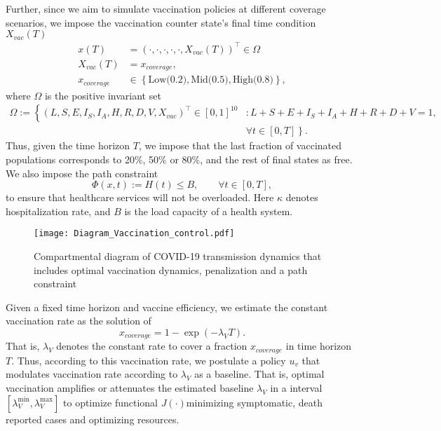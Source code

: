     Further, since we aim to simulate vaccination policies at different coverage
scenarios, we impose the vaccination counter state's final time condition
$X_{vac}(T)$
\begin{equation}
    \begin{aligned}
      x(T) &= (\cdot, \cdot, \cdot, \cdot, \cdot, X_{vac }(T))^{\top}
      \in \Omega
      \\
      X_{vac}(T)
        &= x_{cover age},
      \\
      x_{coverage}
        & \in
        \left \{
          \text{Low(0.2)},\text{Mid(0.5)}, \text{High(0.8)}
        \right \},
    \end{aligned}
\end{equation}
where $\Omega$ is the positive invariant set
\begin{equation*}
    \begin{aligned}
    \Omega := \left\{ \right. 
        (L, S, E, I_S, I_A, H, R, D, V, X_{vac}) ^{\top} \in [0,1]^{10}
        &: 
        L + S + E + I_S + I_A + H+ R + D + V = 1, 
        \\
        &
        \left.
        \forall t \in [0, T]
    \right\}.
    \end{aligned}
\end{equation*}
    Thus, given the time horizon $T$, we impose that the last fraction of
vaccinated populations corresponds to 20\%, 50\% or 80\%, and
the rest of final states as free. We also impose the path constraint
\begin{equation}
    \label{eqn:path_constrain}
    \Phi(x,t):= H(t) \leq B,
    \qquad \forall t \in [0, T],
\end{equation}
to ensure that healthcare services will not be overloaded. Here $\kappa$
denotes hospitalization rate, and $B$ is the load capacity of a
health system.

\begin{figure*}[tbh]
    \centering
      \texttt{[image: Diagram\_Vaccination\_control.pdf]}
    \caption{ Compartmental diagram of COVID-19 transmission dynamics that includes
    optimal vaccination dynamics, penalization and a path constraint}
    \label{fig:DiagramControl}
\end{figure*}

    Given a fixed time horizon and vaccine efficiency,
we estimate the constant vaccination rate as the solution of
\begin{equation}
    x_{coverage} = 1 - \exp(-\lambda_V T).
\end{equation}
    That is, $\lambda_V$ denotes the constant rate
to cover  a fraction $x_{coverage}$ in time horizon $T$.
Thus, according to this vaccination rate, we postulate a policy $u_v$ that
modulates vaccination rate according to $\lambda_V$ as a baseline. That is,
optimal vaccination amplifies or attenuates the estimated baseline
$\lambda_V$ in a interval $[\lambda_V ^ {\min}, \lambda_V ^ {\max}]$
to optimize functional $J(\cdot)$\textemdash minimizing
symptomatic, death reported cases and optimizing resources.

